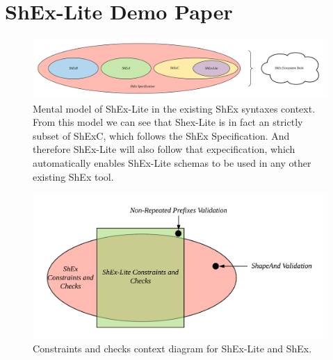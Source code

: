 \chapter{ShEx-Lite Demo Paper}\label{ap:shex-lite-paper}


\begin{figure}
    \includegraphics[width=\textwidth]{images/shex-lite-syntaxes-mental-model.png}
    \centering
    \caption[Mental model of ShEx-Lite in the existing ShEx syntaxes context.]{Mental model of
    ShEx-Lite in the existing ShEx syntaxes context. From this model we can see that Shex-Lite
    is in fact an strictly subset of ShExC, which follows the ShEx Specification. And therefore
    ShEx-Lite will also follow that expecification, which automatically enables ShEx-Lite schemas
    to be used in any other existing ShEx tool.}
    \label{fig:syntax-mental-model}
\end{figure}

\begin{figure}
  \includegraphics[width=\textwidth]{images/shex-lite-constraints-context.png}
  \centering
  \caption[Constraints and checks context diagram for ShEx-Lite and ShEx.]{Constraints
  and checks context diagram for ShEx-Lite and ShEx.}
  \label{fig:constraints-context}
\end{figure}